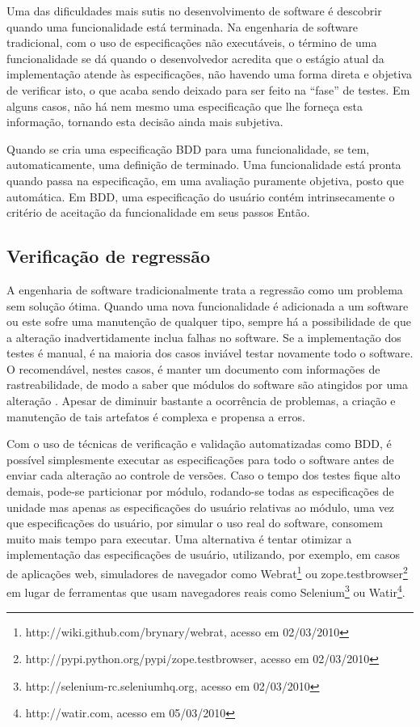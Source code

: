 \documentclass[a4paper,abntfigtabnum,noindentfirst]{abnt}
\begin{document}
Uma das dificuldades mais sutis no desenvolvimento de software é descobrir quando uma funcionalidade está terminada. Na engenharia de software tradicional, com o uso de especificações não executáveis, o término de uma funcionalidade se dá quando o desenvolvedor acredita que o estágio atual da implementação atende às especificações, não havendo uma forma direta e objetiva de verificar isto, o que acaba sendo deixado para ser feito na ``fase'' de testes. Em alguns casos, não há nem mesmo uma especificação que lhe forneça esta informação, tornando esta decisão ainda mais subjetiva.

Quando se cria uma especificação BDD para uma funcionalidade, se tem, automaticamente, uma definição de terminado. Uma funcionalidade está pronta quando passa na especificação, em uma avaliação puramente objetiva, posto que automática. Em BDD, uma especificação do usuário contém intrinsecamente o critério de aceitação da funcionalidade em seus passos Então.


\subsection{Verificação de regressão}
A engenharia de software tradicionalmente trata a regressão como um problema sem solução ótima. Quando uma nova funcionalidade é adicionada a um software ou este sofre uma manutenção de qualquer tipo, sempre há a possibilidade de que a alteração inadvertidamente inclua falhas no software. Se a implementação dos testes é manual, é na maioria dos casos inviável testar novamente todo o software. O recomendável, nestes casos, é manter um documento com informações de rastreabilidade, de modo a saber que módulos do software são atingidos por uma alteração \cite{EngSoftPressman} \cite{EngSoftSommerville}. Apesar de diminuir bastante a ocorrência de problemas, a criação e manutenção de tais artefatos é complexa e propensa a erros.

Com o uso de técnicas de verificação e validação automatizadas como BDD, é possível simplesmente executar as especificações para todo o software antes de enviar cada alteração ao controle de versões. Caso o tempo dos testes fique alto demais, pode-se particionar por módulo, rodando-se todas as especificações de unidade mas apenas as especificações do usuário relativas ao módulo, uma vez que especificações do usuário, por simular o uso real do software, consomem muito mais tempo para executar. Uma alternativa é tentar otimizar a implementação das especificações de usuário, utilizando, por exemplo, em casos de aplicações web, simuladores de navegador como Webrat\footnote{http://wiki.github.com/brynary/webrat, acesso em 02/03/2010} ou zope.testbrowser\footnote{http://pypi.python.org/pypi/zope.testbrowser, acesso em 02/03/2010} em lugar de ferramentas que usam navegadores reais como Selenium\footnote{http://selenium-rc.seleniumhq.org, acesso em 02/03/2010} ou Watir\footnote{http://watir.com, acesso em 05/03/2010}.



\end{document}
